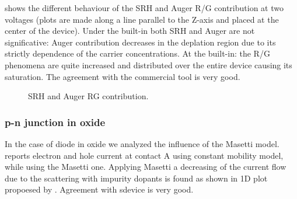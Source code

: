  shows the different behaviour of the SRH and Auger R/G contribution at two voltages (plots are made along a line parallel to the Z-axis and placed at the center of the device). Under the built-in both SRH and Auger are not significative: Auger contribution decreases in the deplation region due to its strictly dependence of the carrier concentrations. At the built-in: the R/G phenomena are quite increased and distributed over the entire device causing its saturation. The agreement with the commercial tool is very good.

\vspace{0.5cm}

\begin{figure}[!h]
\centering

\hspace{0.02\textwidth}

\caption{SRH and Auger RG contribution.}
\label{fig: SRH Auger RG}
\end{figure}

\vspace{0.5cm}

\subsubsection{p-n junction in oxide}

In the case of diode in oxide we analyzed the influence of the Masetti model.  reports electron and hole current at contact A using constant mobility model, while  using the Masetti one. 
Applying Masetti a decreasing of the current flow due to the scattering with impurity dopants is found as shown in 1D plot propoesed by . Agreement with sdevice is very good.

